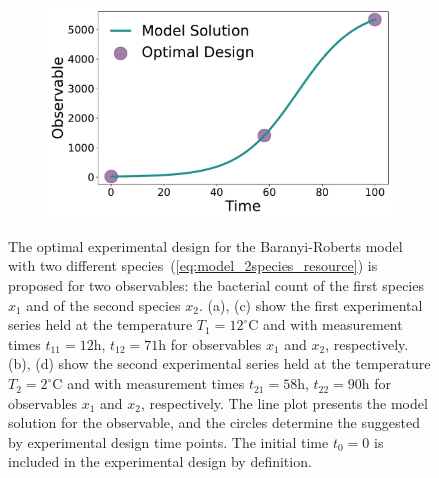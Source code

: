 \documentclass[graybox]{svmult}
\begin{document}
\begin{figure}[H]
\begin{subfigure}{.5\textwidth}
    \end{subfigure}
    \begin{subfigure}{.5\textwidth}
        \centering
        \includegraphics[scale=0.25]{Figures/Fig9d.pdf}
    \end{subfigure} 
    \caption{The optimal experimental design for the Baranyi-Roberts model with two different species~(\ref{eq:model_2species_resource}) is proposed for two observables: the bacterial count of the first species $x_1$ and of the second species $x_2$.
    (a), (c) show the first experimental series held at the temperature $T_1=12^\circ$C and with measurement times $t_{11}=12$h, $t_{12}=71$h for observables $x_1$ and $x_2$, respectively.
    (b), (d) show the second experimental series held at the temperature $T_2=2^\circ$C and with measurement times $t_{21}=58$h, $t_{22}=90$h for observables $x_1$ and $x_2$, respectively.
    The line plot presents the model solution for the observable, and the circles determine the suggested by experimental design time points.
    The initial time $t_0=0$ is included in the experimental design by definition.}
    \label{Fig9}
\end{figure}
%
%
%
\end{document}
